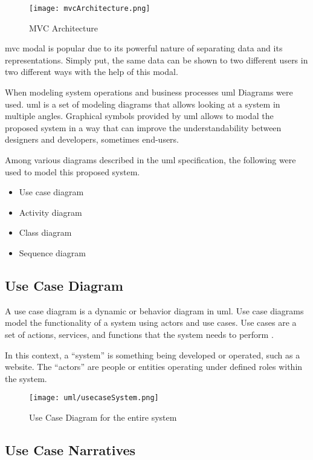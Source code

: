 \documentclass[12pt]{report}
\begin{document}
\begin{figure}[H]
	\centering
	\texttt{[image: mvcArchitecture.png]}
	\caption{MVC Architecture}
\end{figure}

\acrshort{mvc} modal is popular due to its powerful nature of separating data and its representations. Simply put, the same data can be shown to two different users in two different ways with the help of this modal.

When modeling system operations and business processes \acrshort{uml} Diagrams were used. \acrshort{uml} is a set of modeling diagrams that allows looking at a system in multiple angles. Graphical symbols provided by \acrshort{uml} allows to modal the proposed system in a way that can improve the understandability between designers and developers, sometimes end-users.

Among various diagrams described in the \acrshort{uml} specification, the following were used to model this proposed system.

\begin{itemize}
	\item Use case diagram
	\item Activity diagram
	\item Class diagram
	\item Sequence diagram
\end{itemize}

\newpage
\subsection{Use Case Diagram}
A use case diagram is a dynamic or behavior diagram in \acrshort{uml}. Use case diagrams model the functionality of a system using actors and use cases. Use cases are a set of actions, services, and functions that the system needs to perform \cite{vparadigm_2018_uml}.

In this context, a ``system'' is something being developed or operated, such as a website. The ``actors'' are people or entities operating under defined roles within the system.

\begin{figure}[H]
	\centering
	\texttt{[image: uml/usecaseSystem.png]}
	\caption{Use Case Diagram for the entire system}
\end{figure}

\newpage
\subsection{Use Case Narratives}
\end{document}
